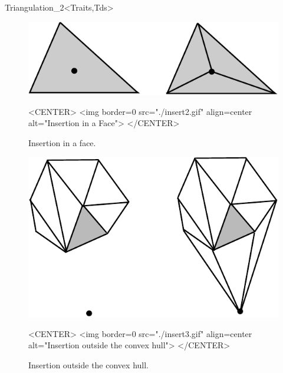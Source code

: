 \begin{ccRefClass}{Triangulation_2<Traits,Tds>}
\begin{figure}
\begin{ccTexOnly}
\begin{center}
\includegraphics{Triangulation_2/insert2}
\end{center}
\end{ccTexOnly}
\caption{Insertion in a face.
\label{Triangulation_ref_Fig_insert2}}

\begin{ccHtmlOnly}
<CENTER>
<img border=0 src="./insert2.gif" align=center alt="Insertion in a Face">
</CENTER>
\end{ccHtmlOnly}
\end{figure}


\begin{figure}
\begin{ccTexOnly}
\begin{center}
\includegraphics{Triangulation_2/insert3}
\end{center}
\end{ccTexOnly}
\caption{Insertion outside the convex hull.
\label{Triangulation_ref_Fig_insert3}}

\begin{ccHtmlOnly}
<CENTER>
<img border=0 src="./insert3.gif" align=center alt="Insertion outside the
convex hull">
</CENTER>
\end{ccHtmlOnly}
\end{figure}


\end{ccRefClass}
